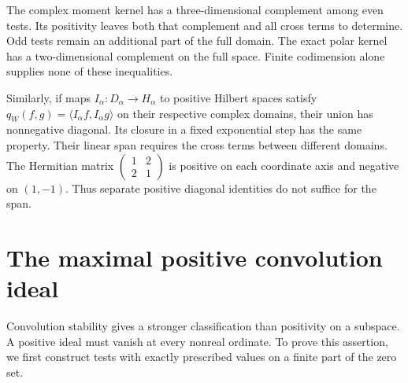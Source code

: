 The complex moment kernel has a three-dimensional complement among even
tests. Its positivity leaves both that complement and all cross terms
to determine. Odd tests remain an additional part of the full domain.
The exact polar kernel has a two-dimensional complement on the full
space. Finite codimension alone supplies none of these inequalities.

Similarly, if maps \(I_\alpha:D_\alpha\to H_\alpha\) to positive
Hilbert spaces satisfy
\(q_W(f,g)=\langle I_\alpha f,I_\alpha g\rangle\) on their respective
complex domains, their union has nonnegative diagonal. Its closure in a
fixed exponential step has the same property. Their linear span requires
the cross terms between different domains. The Hermitian matrix
\(\left(\begin{smallmatrix}1&2\\2&1\end{smallmatrix}\right)\) is positive
on each coordinate axis and negative on \((1,-1)\). Thus separate
positive diagonal identities do not suffice for the span.

\section{The maximal positive convolution ideal}
\label{v4-arith:weil:positive-ideal}

Convolution stability gives a stronger classification than positivity
on a subspace. A positive ideal must vanish at every nonreal ordinate.
To prove this assertion, we first construct tests with exactly prescribed
values on a finite part of the zero set.

